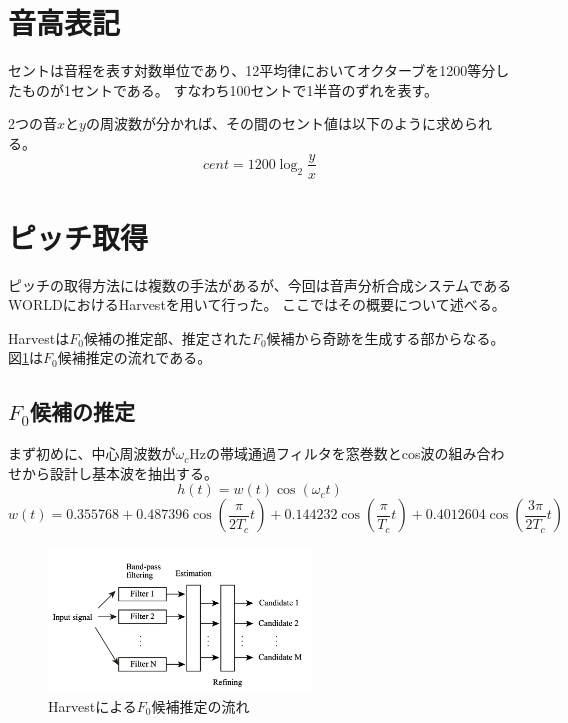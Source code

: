\documentclass[10.5ptj,a4j,dvipdfmx,uplatex, oneside, openany]{jsbook}%
\begin{document}
\section{音高表記}
セントは音程を表す対数単位であり、12平均律においてオクターブを1200等分したものが1セントである。
すなわち100セントで1半音のずれを表す。

2つの音$x$と$y$の周波数が分かれば、その間のセント値は以下のように求められる。
\begin{equation}
    cent = 1200 \log_2 \frac{y}{x} 
\end{equation}


\section{ピッチ取得}
ピッチの取得方法には複数の手法があるが、今回は音声分析合成システムであるWORLD\cite{world}におけるHarvest\cite{harvest}を用いて行った。
ここではその概要について述べる。

Harvestは$F_0$候補の推定部、推定された$F_0$候補から奇跡を生成する部からなる。
図\ref{harvest}は$F_0$候補推定の流れである。

\subsection{$F_0$候補の推定}
まず初めに、中心周波数が$\omega_c$Hzの帯域通過フィルタを窓巻数とcos波の組み合わせから設計し基本波を抽出する。 
\begin{equation}
    h(t) = w(t) \cos(\omega_c t)
\end{equation}
\begin{equation}
    w(t) = 0.355768+0.487396\cos \left(\frac{\pi}{2T_c}t\right) +0.144232\cos \left(\frac{\pi}{T_c}t\right) +0.4012604\cos \left(\frac{3\pi}{2T_c}t\right) 
\end{equation}




\begin{figure}[htbp]
    \begin{center}
      \includegraphics[clip,width=7.0cm]{harvest.png}
      \caption{Harvestによる$F_0$候補推定の流れ\cite{harvest}}
      \label{harvest}
    \end{center}
\end{figure}
\end{document}
